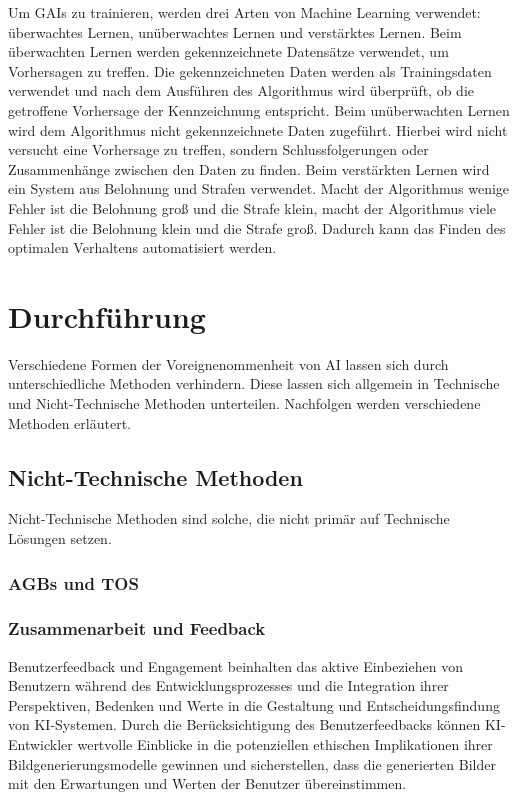 \documentclass[12pt]{article}
\begin{document}
Um GAIs zu trainieren, werden drei Arten von Machine Learning verwendet: überwachtes Lernen, unüberwachtes Lernen und verstärktes Lernen. 
Beim überwachten Lernen werden gekennzeichnete Datensätze verwendet, um Vorhersagen zu treffen. Die gekennzeichneten Daten werden als Trainingsdaten verwendet und nach dem Ausführen des Algorithmus wird überprüft, ob die getroffene Vorhersage der Kennzeichnung entspricht.
Beim unüberwachten Lernen wird dem Algorithmus nicht gekennzeichnete Daten zugeführt. Hierbei wird nicht versucht eine Vorhersage zu treffen, sondern Schlussfolgerungen oder Zusammenhänge zwischen den Daten zu finden.
Beim verstärkten Lernen wird ein System aus Belohnung und Strafen verwendet. Macht der Algorithmus wenige Fehler ist die Belohnung groß und die Strafe klein, macht der Algorithmus viele Fehler ist die Belohnung klein und die Strafe groß. Dadurch kann das Finden des 
optimalen Verhaltens automatisiert werden.

\chapter{Durchführung}
Verschiedene Formen der Voreignenommenheit von AI lassen sich durch unterschiedliche Methoden verhindern. Diese lassen sich allgemein in 
Technische und Nicht-Technische Methoden unterteilen. Nachfolgen werden verschiedene Methoden erläutert.
\section{Nicht-Technische Methoden}
Nicht-Technische Methoden sind solche, die nicht primär auf Technische Lösungen setzen.

\subsection{AGBs und TOS}

\subsection{Zusammenarbeit und Feedback}
Benutzerfeedback und Engagement beinhalten das aktive Einbeziehen von Benutzern während des Entwicklungsprozesses und die Integration ihrer Perspektiven, Bedenken und Werte in die Gestaltung und Entscheidungsfindung von KI-Systemen. Durch die Berücksichtigung des Benutzerfeedbacks können KI-Entwickler wertvolle Einblicke in die potenziellen ethischen Implikationen ihrer Bildgenerierungsmodelle gewinnen und sicherstellen, dass die generierten Bilder mit den Erwartungen und Werten der Benutzer übereinstimmen.
\end{document}
